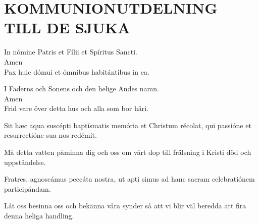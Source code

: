 \chapter{KOMMUNIONUTDELNING TILL DE SJUKA}



\begin{multicols}{2}
\renewcommand{\columnseprulecolor}{\color{rubrica}}
\renewcommand{\columnseprule}{0.4pt}
\va In nómine Patris et Fílii et Spíritus Sancti.\\
\ra Amen\\
\va
Pax huic dómui
et ómnibus habitántibus in ea.
\columnbreak

\va I Faderns och Sonens och den helige Andes namn.\\
\ra Amen\\
\va Frid vare över detta hus och alla som bor häri.
\end{multicols}


\medskip
{}

\medskip

\begin{multicols}{2}
\renewcommand{\columnseprulecolor}{\color{rubrica}}
\renewcommand{\columnseprule}{0.4pt}
Sit hæc aqua suscépti baptísmatis memória et Christum récolat, qui
passióne et resurrectióne sua nos redémit.
\columnbreak

Må detta vatten påminna dig och oss om vårt dop till 
 frälsning i Kristi död och uppståndelse.
\end{multicols}

\medskip
{}

\begin{multicols}{2}
\renewcommand{\columnseprulecolor}{\color{rubrica}}
\renewcommand{\columnseprule}{0.4pt}
\va Fratres, agnoscámus peccáta nostra, ut apti simus ad hanc sacram
celebratiónem participándam.
\columnbreak

\va Låt oss besinna oss och bekänna våra synder så att vi blir väl beredda att fira denna heliga handling.
\end{multicols}

\medskip
{}
\smallskip

